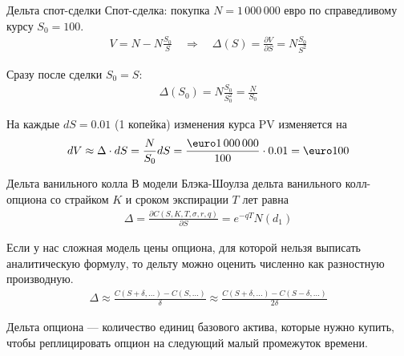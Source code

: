 \documentclass{beamer}
\renewcommand{\EUR}[1]{\textup{\euro}#1}
\begin{document}
\begin{frame}{Дельта спот-сделки}
\justify
Спот-сделка: покупка $N=1\,000\,000$ евро по справедливому курсу $S_0=100$.
\begin{align*}
V = N - N\frac{S_0}{S} \quad \Rightarrow \quad \Delta(S) = \frac{\partial V}{\partial S} = N\frac{S_0}{S^2}
\end{align*}

\justify
Сразу после сделки $S_0=S$:
\begin{align*}
\Delta(S_0) = N\frac{S_0}{S_0^2} = \frac{N}{S_0}
\end{align*}

\justify
На каждые $dS=0.01$ (1 копейка) изменения курса PV изменяется на
\begin{align*}
dV \approx \Delta \cdot dS = \frac{N}{S_0}dS = \frac{\EUR{1\,000\,000}}{100}\cdot 0.01 = \EUR{100}
\end{align*}
\end{frame}



\begin{frame}{Дельта ванильного колла}
\justify
В модели Блэка-Шоулза дельта ванильного колл-опциона со страйком $K$ и сроком экспирации $T$ лет равна
\begin{align*}
\Delta = \frac{\partial C(S, K, T, \sigma, r, q)}{\partial S} = e^{-qT}N(d_1)
\end{align*}

\justify
Если у нас сложная модель цены опциона, для которой нельзя выписать аналитическую формулу, то дельту можно оценить численно как разностную производную.
\begin{align*}
\Delta \approx \frac{C(S+\delta,...) - C(S,...)}{\delta} \approx \frac{C(S+\delta,...) - C(S-\delta,...)}{2\delta}
\end{align*}

\justify
Дельта опциона --- количество единиц базового актива, которые нужно купить, чтобы реплицировать опцион на следующий малый промежуток времени.
\end{frame}
\end{document}

